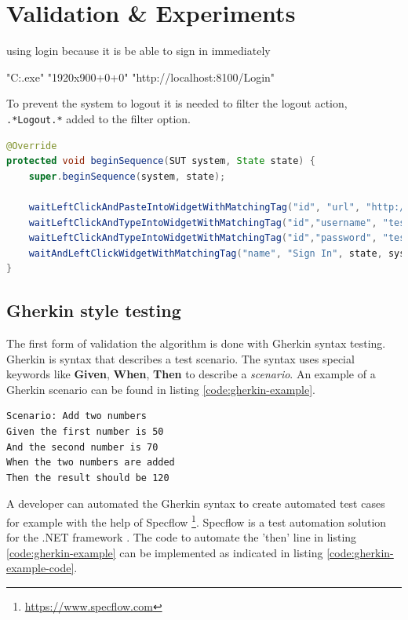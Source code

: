 \chapter{Validation \& Experiments}


using login because it is be able to sign in immediately 
\begin{verbatim*}
"C:\tools\chromedriver.exe" "1920x900+0+0" "http://localhost:8100/Login"
\end{verbatim*}

To prevent the system to logout it is needed to filter the logout action, \verb|.*Logout.*| added to the filter option. 

\begin{lstlisting}[language=Java, caption=Begin Sequence code, label=code:beginSequence]
@Override
protected void beginSequence(SUT system, State state) {
	super.beginSequence(system, state);

	waitLeftClickAndPasteIntoWidgetWithMatchingTag("id", "url", "http://localhost:5000", state, system, 5,1.0);
	waitLeftClickAndTypeIntoWidgetWithMatchingTag("id","username", "testar2\\testar", state, system, 5,1.0);
	waitLeftClickAndTypeIntoWidgetWithMatchingTag("id","password", "testar", state, system, 5,1.0);
	waitAndLeftClickWidgetWithMatchingTag("name", "Sign In", state, system, 5, 1.0);
}
\end{lstlisting}



\section{Gherkin style testing}
The first form of validation the algorithm is done with Gherkin syntax testing. Gherkin is syntax that describes a test scenario. The syntax uses special keywords like \textbf{Given}, \textbf{When}, \textbf{Then} to describe a \textit{scenario}. An example of a Gherkin scenario can be found in listing \ref{code:gherkin-example}.

\begin{lstlisting}[language=Gherkin, caption=Calculator test example, label=code:gherkin-example]
Scenario: Add two numbers
Given the first number is 50
And the second number is 70
When the two numbers are added
Then the result should be 120
\end{lstlisting}

A developer can automated the Gherkin syntax to create automated test cases for example with the help of Specflow \footnote{\url{https://www.specflow.com}}. Specflow is a test automation solution for the .NET framework \cite{specflow}. The code to automate the 'then' line in listing \ref{code:gherkin-example} can be implemented as indicated in listing \ref{code:gherkin-example-code}.

